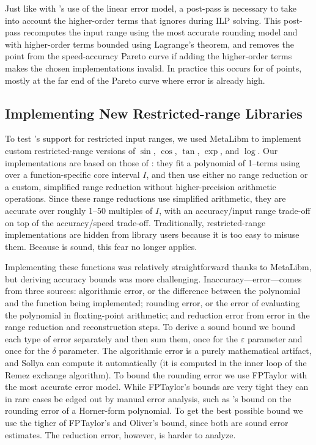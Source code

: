 \documentclass[paper.tex]{subfiles}
\begin{document}
Just like with \name's use of the linear error model,
  a post-pass is necessary
  to take into account the higher-order terms
  that \name ignores during ILP solving.
This post-pass recomputes the input range
  using the most accurate rounding model
  and with higher-order terms bounded using Lagrange's theorem,
  and removes the point from the speed-accuracy Pareto curve
  if adding the higher-order terms makes the chosen implementations invalid.
In practice this occurs for \nBenchDomainViolationRate of points,
  mostly at the far end of the Pareto curve where error is already high.

\subsection{Implementing New Restricted-range Libraries}
\label{ssec:bounding}

To test \name's support for restricted input ranges,
  we used MetaLibm to implement custom restricted-range versions
  of $\sin$, $\cos$, $\tan$, $\exp$, and $\log$.
Our implementations are based on those of \citet{faster-math-functions,even-faster-math-functions}:
  they fit a polynomial of 1--\nMaxTerms terms
  using over a function-specific core interval $I$,
  and then use either no range reduction
  or a custom, simplified range reduction
  without higher-precision arithmetic operations.
Since these range reductions use simplified arithmetic,
  they are accurate over roughly 1--50 multiples of $I$,
  with an accuracy/input range trade-off
  on top of the accuracy/speed trade-off.
Traditionally, restricted-range implementations
  are hidden from library users
  because it is too easy to misuse them.
Because \name is sound, this fear no longer applies.

Implementing these functions
  was relatively straightforward thanks to MetaLibm,
  but deriving accuracy bounds was more challenging.
Inaccuracy---error---comes from three sources:
  algorithmic error, or
  the difference between the polynomial and the function being implemented;
  rounding error, or
  the error of evaluating the polynomial in floating-point arithmetic;
  and reduction error
  from error in the range reduction and reconstruction steps.
To derive a sound bound
  we bound each type of error separately and then sum them,
  once for the $\varepsilon$ parameter
  and once for the $\delta$ parameter.
The algorithmic error is a purely mathematical artifact,
  and Sollya can compute it automatically
  (it is computed in the inner loop of the Remez exchange algorithm).
To bound the rounding error we use FPTaylor
  with the most accurate  error model.
While FPTaylor's bounds are very tight they can in rare cases
  be edged out by manual error analysis,
  such as \citet{horner-bound}'s bound
  on the rounding error of a Horner-form polynomial.
To get the best possible bound
  we use the tigher of FPTaylor's and Oliver's bound,
  since both are sound error estimates.
The reduction error, however, is harder to analyze.
\end{document}
